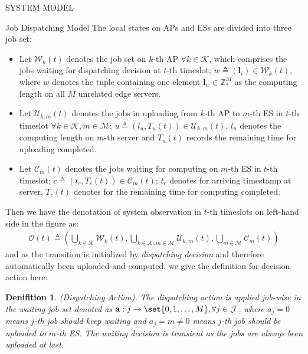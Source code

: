 \documentclass[10pt, conference, letterpaper]{IEEEtran}
\newtheorem{definition}{Denifition}
\newcommand{\eq}{=}
\newcommand{\domZ}{\mathbb{Z}_{*}}
\renewcommand{\vec}{\mathbf}
\DeclarePairedDelimiter\set\{\}
\newcommand{\apSet}{\mathcal{K}}
\newcommand{\esSet}{\mathcal{M}}
\newcommand{\jSet}{\mathcal{J}}
\newcommand{\wSet}{\mathcal{W}}
\newcommand{\uSet}{\mathcal{U}}
\newcommand{\cSet}{\mathcal{C}}
\begin{document}
\begin{section}{SYSTEM MODEL}
\begin{subsection}{Job Dispatching Model}
            The local states on APs and ESs are divided into three job set:
            \begin{itemize}
                \item Let $\wSet_{k}(t)$ denotes the job set on $k$-th AP $\forall k \in \apSet$, which comprises the jobs waiting for dispatching decision at $t$-th timeslot; $w \triangleq (\vec{l}_i) \in \wSet_{k}(t)$, where $w$ denotes the tuple containing one element $\vec{l}_w \in \domZ^M$ as the computing length on all $M$ unrelated edge servers.
                \item Let $\uSet_{k,m}(t)$ denotes the jobs in uploading from $k$-th AP to $m$-th ES in $t$-th timeslot $\forall k \in \apSet, m \in \esSet$; $u \triangleq (l_u, T_{u}(t)) \in \uSet_{k,m}(t)$, $l_u$ denotes the computing length on $m$-th server and $T_{u}(t)$ records the remaining time for uploading completed.
                \item Let $\cSet_{m}(t)$ denotes the jobs waiting for computing on $m$-th ES in $t$-th timeslot; $c \triangleq (t_c, T_{c}(t)) \in \cSet_{m}(t)$; $t_c$ denotes for arriving timestamp at server, $T_{c}(t)$ denotes for the remaining time for computing completed.
            \end{itemize}

            Then we have the denotation of system observation in $t$-th timeslots on left-hand side in the figure as:
            \begin{align}
                \mathcal{O}(t) \triangleq (\bigcup\limits_{k\in\apSet}\wSet_{k}(t), \bigcup\limits_{k\in\apSet, m\in\esSet}\uSet_{k,m}(t), \bigcup\limits_{m\in\esSet}\cSet_{m}(t))
            \end{align}
            and as the transition is initialized by \emph{dispatching decision} and therefore automatically been uploaded and computed, we give the definition for decision action here:
            \begin{definition}
                (Dispatching Action).
                The dispatching action is applied job-wise in the waiting job set denoted as $\vec{a}: j \to \set{0,1,\dots,M}, \forall j\in\jSet$, where $a_j\eq0$ means $j$-th job should keep waiting and $a_j=m\neq0$ means $j$-th job should be uploaded to $m$-th ES. The waiting decision is transient as the jobs are always been uploaded at last.
            \end{definition}


\end{subsection}
\end{section}
\end{document}
